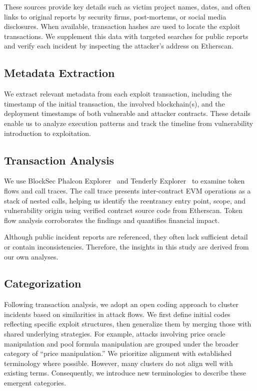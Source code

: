 These sources provide key details such as victim project names, dates, and often links to original reports by security firms, post-mortems, or social media disclosures. When available, transaction hashes are used to locate the exploit transactions. We supplement this data with targeted searches for public reports and verify each incident by inspecting the attacker's address on Etherscan.


\subsection{Metadata Extraction}

We extract relevant metadata from each exploit transaction, including the timestamp of the initial transaction, the involved blockchain(s), and the deployment timestamps of both vulnerable and attacker contracts. These details enable us to analyze execution patterns and track the timeline from vulnerability introduction to exploitation.


\subsection{Transaction Analysis}
\label{methodology:transaction-analysis}

We use BlockSec Phalcon Explorer~\cite{blocksec-security-incidents} and Tenderly Explorer~\cite{tenderly} to examine token flows and call traces. The call trace presents inter-contract EVM operations as a stack of nested calls, helping us identify the reentrancy entry point, scope, and vulnerability origin using verified contract source code from Etherscan. Token flow analysis corroborates the findings and quantifies financial impact.

Although public incident reports are referenced, they often lack sufficient detail or contain inconsistencies. Therefore, the insights in this study are  derived from our own analyses.


\subsection{Categorization}

Following transaction analysis, we adopt an open coding approach to cluster incidents based on similarities in attack flows. We first define initial codes reflecting specific exploit structures, then generalize them by merging those with shared underlying strategies. For example, attacks involving price oracle manipulation and pool formula manipulation are grouped under the broader category of ``price manipulation.'' We prioritize alignment with established terminology where possible. However, many clusters do not align well with existing terms. Consequently, we introduce new terminologies to describe these emergent categories.


